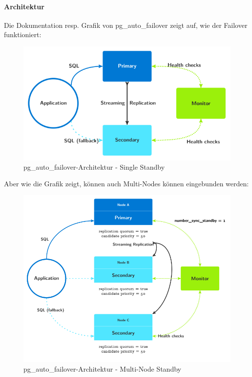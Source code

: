 \begin{flushleft}
    \paragraph{Architektur}
    Die Dokumentation resp. Grafik von pg\_auto\_failover \cite{PZZIZ5RT} zeigt auf, wie der Failover funktioniert:
    \begin{figure}[H]
        \centering
        \includegraphics[width=0.75\linewidth]{source/implementation/evaluation/postgresql_ha_solutions/pg_auto_failover/pg_auto-failover_arch-single-standby}
        \caption{pg\_auto\_failover-Architektur - Single Standby}
        \label{fig:pg_auto-failover_arch-single-standby}
    \end{figure}
    Aber wie die Grafik zeigt, können auch Multi-Nodes können eingebunden werden\cite{4ZKBDG57}:
    \begin{figure}[H]
        \centering
        \includegraphics[width=0.75\linewidth]{source/implementation/evaluation/postgresql_ha_solutions/pg_auto_failover/pg_auto-failover_arch-multi-standby}
        \caption{pg\_auto\_failover-Architektur - Multi-Node Standby}
        \label{fig:pg_auto-failover_arch-multi-standby}
    \end{figure}


\end{flushleft}
